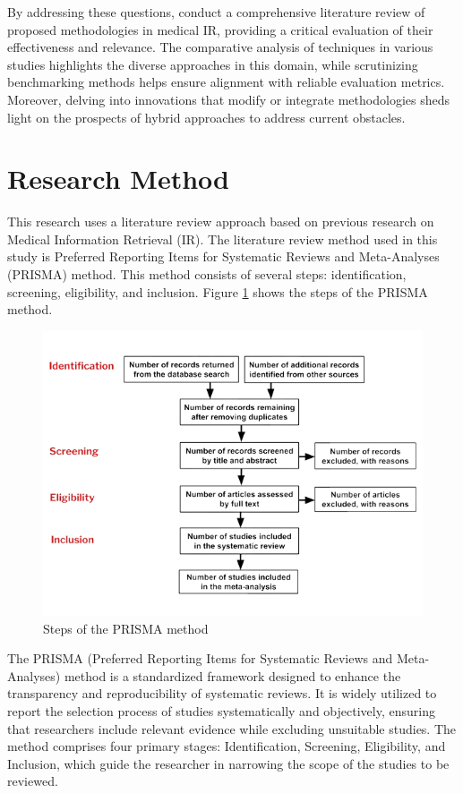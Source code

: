 \documentclass[conference]{IEEEtran}
\begin{document}
By addressing these questions, conduct a comprehensive literature review of proposed methodologies in medical IR, providing a critical evaluation of their effectiveness and relevance. The comparative analysis of techniques in various studies highlights the diverse approaches in this domain, while scrutinizing benchmarking methods helps ensure alignment with reliable evaluation metrics. Moreover, delving into innovations that modify or integrate methodologies sheds light on the prospects of hybrid approaches to address current obstacles.

\section{Research Method}

This research uses a literature review approach based on previous research on Medical Information Retrieval (IR). The literature review method used in this study is Preferred Reporting Items for Systematic Reviews and Meta-Analyses (PRISMA) method. This method consists of several steps: identification, screening, eligibility, and inclusion. Figure \ref{fig:PRISMA} shows the steps of the PRISMA method.

\begin{figure}[ht!]
    \centering
    \includegraphics[scale=.4]{PRISMA.png}
    \caption{Steps of the PRISMA method}
    \label{fig:PRISMA}
\end{figure}

The PRISMA (Preferred Reporting Items for Systematic Reviews and Meta-Analyses) method is a standardized framework designed to enhance the transparency and reproducibility of systematic reviews. It is widely utilized to report the selection process of studies systematically and objectively, ensuring that researchers include relevant evidence while excluding unsuitable studies. The method comprises four primary stages: Identification, Screening, Eligibility, and Inclusion, which guide the researcher in narrowing the scope of the studies to be reviewed.
\end{document}
